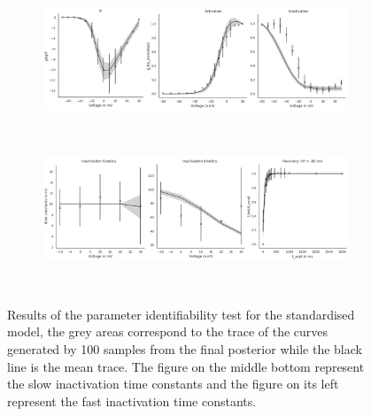 \documentclass[11pt]{report}
\begin{document}
\begin{figure}[H]
    \centering
    \captionsetup{singlelinecheck = false, format= hang, justification=centerlast, font=footnotesize, labelsep=space}
    \begin{subfigure}[b]{\textwidth}
    \centering
        \includegraphics[width=\linewidth]{figures/Ica_Simple_Li/ica_simple_exp_iv_act_inact_all_saka_pop_10000.png}
    \end{subfigure}
    ~
    \begin{subfigure}[b]{\textwidth}
    \centering
        \includegraphics[width=\linewidth]{figures/Ica_Simple_Li/ica_simple_exp_inact_kin_recov_all_saka_pop_10000.png}
    \end{subfigure}
    ~

    \caption{Results of the parameter identifiability test for the standardised model, the grey areas correspond to the trace of the curves generated by 100 samples from the final posterior while the black line is the mean trace. The figure on the middle bottom represent the slow inactivation time constants and the figure on its left represent the fast inactivation time constants.}
    \label{fig:resultsStandardisedIca}
\end{figure}
\end{document}
